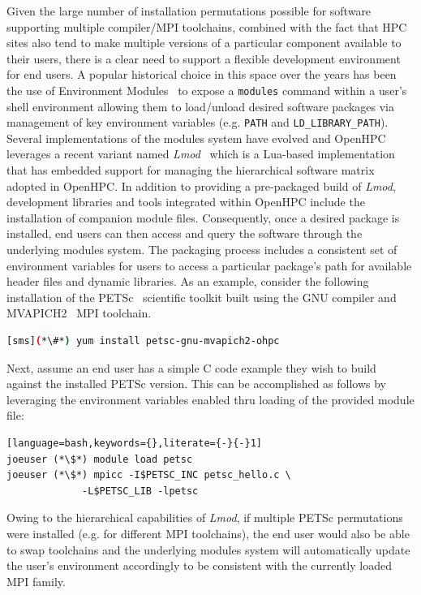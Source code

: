 \documentclass{sig-alternate-05-2015}
\begin{document}
\noindent
Given the large number of installation permutations possible for software
supporting multiple compiler/MPI toolchains, combined with the fact that HPC
sites also tend to make multiple versions of a particular component available
to their users, there is a clear need to support a flexible development environment for end
users. A popular historical choice in this space over the years has been the
use of Environment Modules~\cite{furlani_1996} to expose a \texttt{modules}
command within a user's shell environment allowing them to load/unload desired
software packages via management of key environment variables
(e.g. \texttt{{PATH}} and \texttt{{LD\_LIBRARY\_PATH}}). Several
implementations of the modules system have evolved and OpenHPC leverages a
recent variant named {\em Lmod}~\cite{tacc_sc_best_practices:2011,lmod_url}
which is a Lua-based implementation that has embedded support for managing the
hierarchical software matrix adopted in OpenHPC.  In addition to providing a
pre-packaged build of {\em Lmod}, development libraries and tools integrated
within OpenHPC include the installation of companion module files.
Consequently, once a desired package is installed, end users can then access
and query the software through the underlying modules system. The packaging
process includes a consistent set of environment variables for users to
access a particular package's path for available header files and dynamic
libraries. As an example, consider the following installation of the
PETSc~\cite{PETSc_url} scientific toolkit built using the GNU compiler and
MVAPICH2~\cite{MVAPICH_url} MPI toolchain.

\begin{lstlisting}[language=bash,keywords={}]
[sms](*\#*) yum install petsc-gnu-mvapich2-ohpc
\end{lstlisting}

\noindent
Next, assume an end user has a simple C code example they wish to build against
the installed PETSc version. This can be accomplished as follows by leveraging
the environment variables enabled thru loading of the provided module file:

\begin{lstlisting}[language=bash,keywords={},literate={-}{-}1]
joeuser (*\$*) module load petsc
joeuser (*\$*) mpicc -I$PETSC_INC petsc_hello.c \
             -L$PETSC_LIB -lpetsc
\end{lstlisting}

Owing to the hierarchical capabilities of {\em Lmod}, if multiple PETSc
permutations were installed (e.g. for different MPI toolchains), the end user
would also be able to swap toolchains and the underlying modules system will
automatically update the user's environment accordingly to be consistent with
the currently loaded MPI family.
\end{document}
